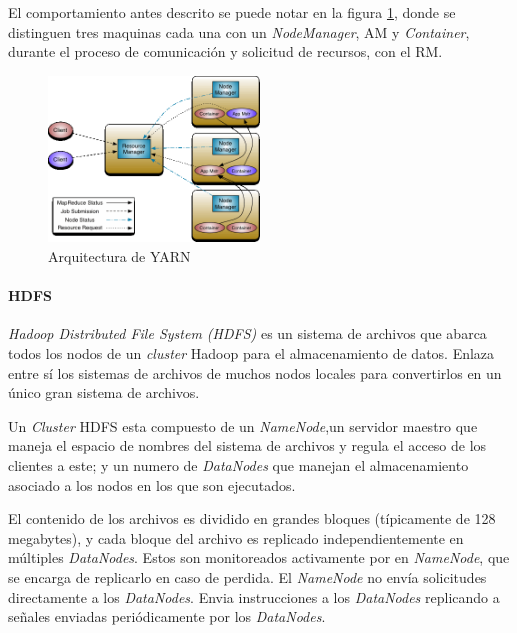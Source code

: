  	El comportamiento antes descrito se puede notar en la figura \ref{fig:yarn}, donde se distinguen tres maquinas cada una con un \textit{NodeManager}, AM y \textit{Container}, durante el proceso de comunicación y solicitud de recursos, con el RM.  

\begin{figure}[!htbp]
    \centering
    \includegraphics[width=0.5\textwidth]{Figuras/yarn.png}
    \caption{Arquitectura de YARN}
    \label{fig:yarn}
\end{figure}


\paragraph{HDFS} \textit{Hadoop Distributed File System (HDFS)} es un sistema de archivos que abarca todos los nodos de un \textit{cluster} Hadoop para el almacenamiento de datos. Enlaza entre sí los sistemas de archivos de muchos nodos locales para convertirlos en un único gran sistema de archivos.\cite{quehadoop}

Un \textit{Cluster} HDFS esta compuesto de un \textit{NameNode},un servidor maestro que maneja el espacio de nombres del sistema de archivos y regula el acceso de los clientes a este; y un numero de \textit{DataNodes} que manejan el almacenamiento asociado a los nodos en los que son ejecutados.\cite{horhdfs}

El contenido de los archivos es dividido en grandes bloques (típicamente de 128 megabytes), y cada bloque del archivo es replicado independientemente en múltiples \textit{DataNodes}. Estos son monitoreados activamente por en \textit{NameNode}, que se encarga de replicarlo en caso de perdida.\cite{horhdfs}
El \textit{NameNode} no envía solicitudes directamente a los \textit{DataNodes}. Envia instrucciones a los \textit{DataNodes} replicando a señales enviadas periódicamente por los \textit{DataNodes}.\cite{horhdfs}

